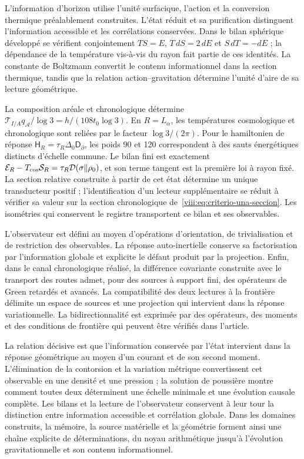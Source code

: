L'information d'horizon utilise l'unité surfacique,
l'action et la conversion thermique préalablement construites.
L'état réduit et sa purification distinguent l'information
accessible et les corrélations conservées. Dans le bilan sphérique
développé se vérifient conjointement \(TS=E\),
\(T\,dS=2\,dE\) et \(S\,dT=-dE\) ; la dépendance de
la température vis-à-vis du rayon fait partie de ces identités.
La constante de Boltzmann convertit le contenu informationnel
dans la section thermique, tandis que la relation action--gravitation
détermine l'unité d'aire de sa lecture géométrique.

La composition aréale et chronologique détermine
\(\mathcal T_{I/A}q_{\mathcal A}/\log3=h/(108t_0\log3)\).
En \(R=L_\alpha\), les températures cosmologique et chronologique
sont reliées par le facteur \(\log3/(2\pi)\).
Pour le hamiltonien de réponse
\(\mathsf H_R=\tau_R\Delta_0\mathsf D_\partial\), les poids
90 et 120 correspondent à des sauts énergétiques distincts d'échelle
commune. Le bilan fini est exactement
\(\mathcal E_R-T_{\rm cos}\mathcal S_R
=\tau_R\mathcal D(\sigma\Vert\rho_0)\), et son terme tangent
est la première loi à rayon fixé. La section relative construite à partir de
cet état détermine un unique transducteur positif ; l'identification
d'un lecteur supplémentaire se réduit à vérifier sa valeur sur la section
chronologique de~\eqref{viii:eq:criterio-una-seccion}. Les isométries qui
conservent le registre transportent ce bilan et ses observables.

L'observateur est défini au moyen d'opérations d'orientation, de trivialisation et de restriction des observables. La réponse auto-inertielle conserve sa factorisation par l'information globale et explicite le défaut produit par la projection. Enfin, dans le canal chronologique réalisé, la différence covariante construite avec le transport des routes admet, pour des sources à support fini, des opérateurs de Green retardés et avancés. La compatibilité des deux lectures à la frontière délimite un espace de sources et une projection qui intervient dans la réponse variationnelle. La bidirectionnalité est exprimée par des opérateurs, des moments et des conditions de frontière qui peuvent être vérifiés dans l'article.

\enlargethispage{2\baselineskip}
La relation décisive est que l'information conservée par l'état
intervient dans la réponse géométrique au moyen d'un courant et de son second
moment. L'élimination de la contorsion et la variation métrique convertissent
cet observable en une densité et une pression ; la solution de poussière montre
comment toutes deux déterminent une échelle minimale et une évolution causale complète.
Les bilans et la lecture de l'observateur conservent à leur tour la
distinction entre information accessible et corrélation globale. Dans les
domaines construits, la mémoire, la source matérielle et la géométrie forment ainsi une
chaîne explicite de déterminations, du noyau arithmétique jusqu'à
l'évolution gravitationnelle et son contenu informationnel.
